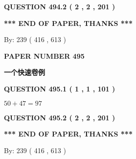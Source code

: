 \documentclass{ctexart}
\begin{document}
 
  
\vspace{0.2in}
  
{\textbf{\Large{QUESTION
494.2 
 ( 2 , 2 , 201 )
}}}
  
  
   
   
 \vspace{0.2in}
 
   
   
   
   
\vspace{1.0in} 
{\textbf{\large{ *** END OF PAPER, THANKS *** }}} 
   
   
\hspace{1.0in} By: 
 239 ( 416 ,  613 )
   
   
   
   
\newpage 
\setcounter{page}{ 
   495001 } 
   
   
   
   
 {\textbf{ \Large{ PAPER NUMBER  495  }}}
   
   
\vspace{0.2in}
   
   
   
   
   
   
 \vspace{0.2in}
{\LARGE {\textbf{ 一个快速卷例}}}
   
   
  
\vspace{0.2in}
  
{\textbf{\Large{QUESTION
495.1 
 ( 1 , 1 , 101 )
}}}
  
  
 
 

$ %
50 +  %
47=   %
97$
 
 
  
\vspace{0.2in}
  
{\textbf{\Large{QUESTION
495.2 
 ( 2 , 2 , 201 )
}}}
  
  
   
   
 \vspace{0.2in}
 
   
   
   
   
\vspace{1.0in} 
{\textbf{\large{ *** END OF PAPER, THANKS *** }}} 
   
   
\hspace{1.0in} By: 
 239 ( 416 ,  613 )
   
\end{document}
